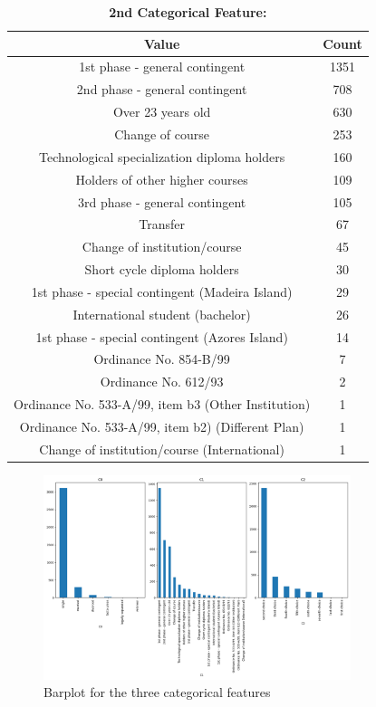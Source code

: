 \documentclass{article}
\begin{document}
\begin{table}[h!]
        \centering %
        \small
    \begin{tabular}{|c|c|}
        \hline
        Value & Count \\
        \hline
        1st phase - general contingent   & 1351 \\
        2nd phase - general contingent & 708 \\
        Over 23 years old  & 630 \\
        Change of course & 253 \\
        Technological specialization diploma holders & 160 \\
        Holders of other higher courses & 109 \\
        3rd phase - general contingent  & 105 \\
        Transfer & 67 \\
        Change of institution/course & 45 \\
        Short cycle diploma holders  & 30 \\
        1st phase - special contingent (Madeira Island) & 29 \\
        International student (bachelor) & 26 \\
        1st phase - special contingent (Azores Island) & 14 \\
        Ordinance No. 854-B/99 & 7 \\
        Ordinance No. 612/93 & 2 \\
        Ordinance No. 533-A/99, item b3 (Other Institution) & 1 \\
        Ordinance No. 533-A/99, item b2) (Different Plan) & 1 \\
        Change of institution/course (International) & 1 \\
        \hline
        
    \end{tabular}
    \caption{\textbf{2nd Categorical Feature:}}  
\end{table}

\begin{figure}[h!]
    \centering
    \includegraphics[width=0.8\textwidth]{./pic/categorical.png}
    \caption{Barplot for the three categorical features}
\end{figure}
\end{document}
